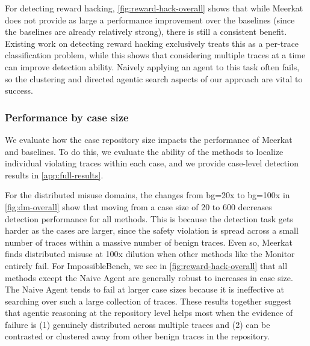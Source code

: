 \documentclass{article} %
\newcommand{\ourmethod}{Meerkat\xspace}
\begin{document}
For detecting reward hacking, \cref{fig:reward-hack-overall} shows that while \ourmethod does not provide as large a performance improvement over the baselines (since the baselines are already relatively strong), there is still a consistent benefit. Existing work on detecting reward hacking exclusively treats this as a per-trace classification problem, while this shows that considering multiple traces at a time can improve detection ability. Naively applying an agent to this task often fails, so the clustering and directed agentic search aspects of our approach are vital to success.















\subsubsection{Performance by case size}

We evaluate how the case repository size impacts the performance of \ourmethod and baselines.
To do this, we evaluate the ability of the methods to localize individual violating traces within each case, and we provide case-level detection results in \cref{app:full-results}.

For the distributed misuse domains, the changes from bg=20x to bg=100x in \cref{fig:dm-overall} show that moving from a case size of 20 to 600 decreases detection performance for all methods. This is because the detection task gets harder as the cases are larger, since the safety violation is spread across a small number of traces within a massive number of benign traces. Even so, \ourmethod finds distributed misuse at 100x dilution when other methods like the Monitor entirely fail.  
For ImpossibleBench, we see in \cref{fig:reward-hack-overall} that all methods except the Naive Agent are generally robust to increases in case size. The Naive Agent tends to fail at larger case sizes because it is ineffective at searching over such a large collection of traces.  
These results together suggest that agentic reasoning at the repository level helps most when the evidence of failure is (1) genuinely distributed across multiple traces and (2) can be contrasted or clustered away from other benign traces in the repository.
\end{document}
